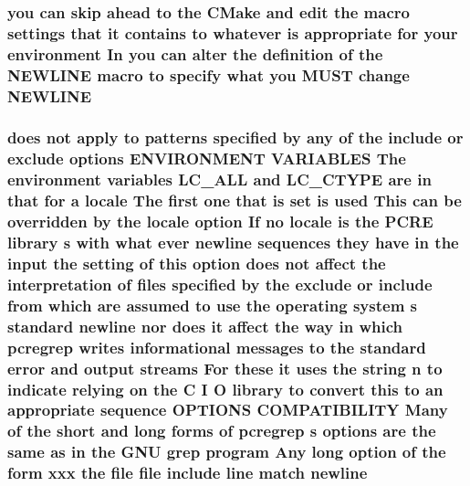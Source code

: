 \subsubsection[{\texorpdfstring{N\+E\+W\+L\+I\+NE}{NEWLINE}}]{\setlength{\rightskip}{0pt plus 5cm}you {\bf can} {\bf skip} ahead {\bf to} the C\+Make and edit the macro settings that {\bf it} {\bf contains} {\bf to} whatever {\bf is} appropriate for your {\bf environment} In you {\bf can} alter the definition {\bf of} the N\+E\+W\+L\+I\+NE macro {\bf to} specify {\bf what} you M\+U\+ST change N\+E\+W\+L\+I\+NE}\hypertarget{NON-AUTOTOOLS-BUILD_8txt_ab26dfb3784697f4ae91f356713845063}{}\label{NON-AUTOTOOLS-BUILD_8txt_ab26dfb3784697f4ae91f356713845063}
\subsubsection[{\texorpdfstring{newline}{newline}}]{ does {\bf not} apply {\bf to} {\bf patterns} {\bf specified} by {\bf any} {\bf of} the {\bf include} {\bf or} {\bf exclude} {\bf options} E\+N\+V\+I\+R\+O\+N\+M\+E\+NT V\+A\+R\+I\+A\+B\+L\+ES The {\bf environment} {\bf variables} L\+C\+\_\+\+A\+LL and L\+C\+\_\+\+C\+T\+Y\+PE {\bf are} {\bf in} that for {\bf a} {\bf locale} The {\bf first} one that {\bf is} {\bf set} {\bf is} {\bf used} This {\bf can} {\bf be} overridden by the {\bf locale} {\bf option} If no {\bf locale} {\bf is} the {\bf P\+C\+RE} {\bf library} {\bf s} {\bf with} {\bf what} {\bf ever} newline sequences they have {\bf in} the {\bf input} the {\bf setting} {\bf of} {\bf this} {\bf option} does {\bf not} affect the interpretation {\bf of} {\bf files} {\bf specified} by the {\bf exclude} {\bf or} {\bf include} {\bf from} {\bf which} {\bf are} assumed {\bf to} use the operating {\bf system} {\bf s} standard newline nor does {\bf it} affect the {\bf way} {\bf in} {\bf which} pcregrep writes informational messages {\bf to} the standard {\bf error} and {\bf output} streams For these {\bf it} uses the {\bf string} {\bf n} {\bf to} indicate relying {\bf on} the {\bf C} {\bf I} O {\bf library} {\bf to} convert {\bf this} {\bf to} an appropriate {\bf sequence} {\bf O\+P\+T\+I\+O\+NS} C\+O\+M\+P\+A\+T\+I\+B\+I\+L\+I\+TY Many {\bf of} the short and long forms {\bf of} pcregrep {\bf s} {\bf options} {\bf are} the same {\bf as} {\bf in} the G\+NU {\bf grep} {\bf program} Any long {\bf option} {\bf of} the form {\bf xxx} the {\bf file} {\bf file} {\bf include} {\bf line} {\bf match} newline}\hypertarget{NON-AUTOTOOLS-BUILD_8txt_a9f48ea6b13757e0a4c5b5a6dfd7f178e}{}\label{NON-AUTOTOOLS-BUILD_8txt_a9f48ea6b13757e0a4c5b5a6dfd7f178e}
